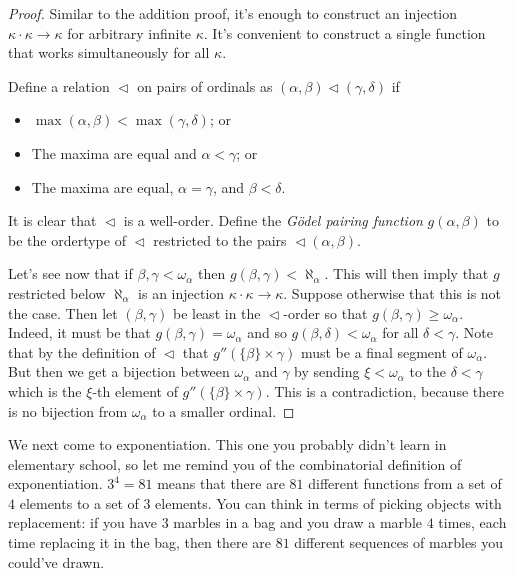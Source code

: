 \documentclass[10pt]{amsart}
\begin{document}
\begin{proof}
Similar to the addition proof, it's enough to construct an injection $\kappa \cdot \kappa \to \kappa$ for arbitrary infinite $\kappa$. It's convenient to construct a single function that works simultaneously for all $\kappa$.

Define a relation $\vartriangleleft$ on pairs of ordinals as $(\alpha,\beta) \vartriangleleft (\gamma,\delta)$ if
\begin{itemize}
\item $\max(\alpha,\beta) < \max(\gamma,\delta)$; or
\item The maxima are equal and $\alpha < \gamma$; or
\item The maxima are equal, $\alpha = \gamma$, and $\beta < \delta$.
\end{itemize}
It is clear that $\vartriangleleft$ is a well-order. Define the \emph{G\"odel pairing function} $g(\alpha,\beta)$ to be the ordertype of $\vartriangleleft$ restricted to the pairs $\vartriangleleft (\alpha,\beta)$. 

Let's see now that if $\beta,\gamma < \omega_\alpha$ then $g(\beta,\gamma) < \aleph_\alpha$. This will then imply that $g$ restricted below $\aleph_\alpha$ is an injection $\kappa \cdot \kappa \to \kappa$. Suppose otherwise that this is not the case. Then let $(\beta,\gamma)$ be least in the $\vartriangleleft$-order so that $g(\beta,\gamma) \ge \omega_\alpha$. Indeed, it must be that $g(\beta,\gamma) = \omega_\alpha$ and so $g(\beta,\delta) < \omega_\alpha$ for all $\delta < \gamma$. Note that by the definition of $\vartriangleleft$ that $g''(\{\beta\} \times \gamma)$ must be a final segment of $\omega_\alpha$.  But then we get a bijection between $\omega_\alpha$ and $\gamma$ by sending $\xi < \omega_\alpha$ to the $\delta < \gamma$ which is the $\xi$-th element of $g''(\{\beta\} \times \gamma)$. This is a contradiction, because there is no bijection from $\omega_\alpha$ to a smaller ordinal.
\end{proof}

We next come to exponentiation. This one you probably didn't learn in elementary school, so let me remind you of the combinatorial definition of exponentiation. $3^4 = 81$ means that there are $81$ different functions from a set of $4$ elements to a set of $3$ elements. You can think in terms of picking objects with replacement: if you have $3$ marbles in a bag and you draw a marble $4$ times, each time replacing it in the bag, then there are $81$ different sequences of marbles you could've drawn. 
\end{document}
